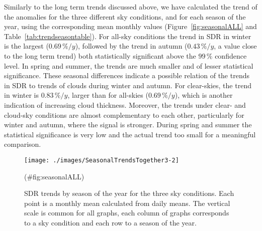 \documentclass[
  preprint, 3p, authoryear]{article}
\begin{document}
Similarly to the long term trends discussed above, we have calculated the trend of the anomalies for the three different sky conditions, and for each season of the year, using the corresponding mean monthly values
(Figure~\ref{fig:seasonalALL} and Table~\ref{tab:trendseasontable}).
For all-sky conditions the trend in SDR in winter is the largest
(\(0.69\,\%/y\)),
followed by the trend in autumn
(\(0.43\,\%/y\),
a value close to the long term trend) both statistically significant above the \(99\,\%\) confidence level.
In spring and summer, the trends are much smaller and of lesser statistical significance.
These seasonal differences indicate a possible relation of the trends in SDR to trends of clouds during winter and autumn.
For clear-skies, the trend in winter is \(0.83\,\%/y\), larger than for all-skies (\(0.69\,\%/y\)), which is another indication of increasing cloud thickness.
Moreover, the trends under clear- and cloud-sky conditions are almost complementary to each other, particularly for winter and autumn, where the signal is stronger.
During spring and summer the statistical significance is very low and the actual trend too small for a meaningful comparison.

\begin{figure}[h!]

{\centering \texttt{[image: ./images/SeasonalTrendsTogether3-2]} 

}

\caption{SDR trends by season of the year for the three sky conditions. Each point is a monthly mean calculated from daily means. The vertical scale is common for all graphs, each column of graphs corresponds to a sky condition and each row to a season of the year.}(\#fig:seasonalALL)
\end{figure}
\end{document}

